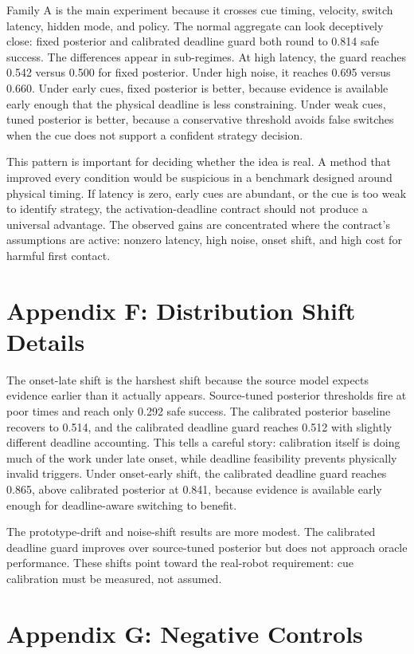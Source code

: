 \documentclass{article}
\begin{document}
Family A is the main experiment because it crosses cue timing, velocity, switch latency, hidden mode, and policy. The normal aggregate can look deceptively close: fixed posterior and calibrated deadline guard both round to 0.814 safe success. The differences appear in sub-regimes. At high latency, the guard reaches 0.542 versus 0.500 for fixed posterior. Under high noise, it reaches 0.695 versus 0.660. Under early cues, fixed posterior is better, because evidence is available early enough that the physical deadline is less constraining. Under weak cues, tuned posterior is better, because a conservative threshold avoids false switches when the cue does not support a confident strategy decision.

This pattern is important for deciding whether the idea is real. A method that improved every condition would be suspicious in a benchmark designed around physical timing. If latency is zero, early cues are abundant, or the cue is too weak to identify strategy, the activation-deadline contract should not produce a universal advantage. The observed gains are concentrated where the contract's assumptions are active: nonzero latency, high noise, onset shift, and high cost for harmful first contact.

\section{Appendix F: Distribution Shift Details}

The onset-late shift is the harshest shift because the source model expects evidence earlier than it actually appears. Source-tuned posterior thresholds fire at poor times and reach only 0.292 safe success. The calibrated posterior baseline recovers to 0.514, and the calibrated deadline guard reaches 0.512 with slightly different deadline accounting. This tells a careful story: calibration itself is doing much of the work under late onset, while deadline feasibility prevents physically invalid triggers. Under onset-early shift, the calibrated deadline guard reaches 0.865, above calibrated posterior at 0.841, because evidence is available early enough for deadline-aware switching to benefit.

The prototype-drift and noise-shift results are more modest. The calibrated deadline guard improves over source-tuned posterior but does not approach oracle performance. These shifts point toward the real-robot requirement: cue calibration must be measured, not assumed.

\section{Appendix G: Negative Controls}
\end{document}
